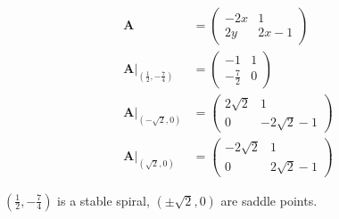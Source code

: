 \documentclass{article}
\begin{document}
\begin{align*}
  \mathbf{A}                                                           & = \begin{pmatrix}
                                                                             -2 x & 1       \\
                                                                             2 y  & 2 x - 1
                                                                           \end{pmatrix}               \\
  \left. \mathbf{A} \right|_{\left( \frac{1}{2}, -\frac{7}{4} \right)} & = \begin{pmatrix}
                                                                             -1           & 1 \\
                                                                             -\frac{7}{2} & 0
                                                                           \end{pmatrix}             \\
  \left. \mathbf{A} \right|_{(-\sqrt{2}, 0)}                           & = \begin{pmatrix}
                                                                             2 \sqrt{2} & 1               \\
                                                                             0          & -2 \sqrt{2} - 1
                                                                           \end{pmatrix} \\
  \left. \mathbf{A} \right|_{(\sqrt{2}, 0)}                            & = \begin{pmatrix}
                                                                             -2 \sqrt{2} & 1              \\
                                                                             0           & 2 \sqrt{2} - 1
                                                                           \end{pmatrix}
\end{align*}

$\left( \frac{1}{2}, -\frac{7}{4} \right)$ is a stable spiral, $(\pm \sqrt{2}, 0)$ are saddle points.

\setcounter{subsubsection}{14}
\subsubsection{}
\end{document}
